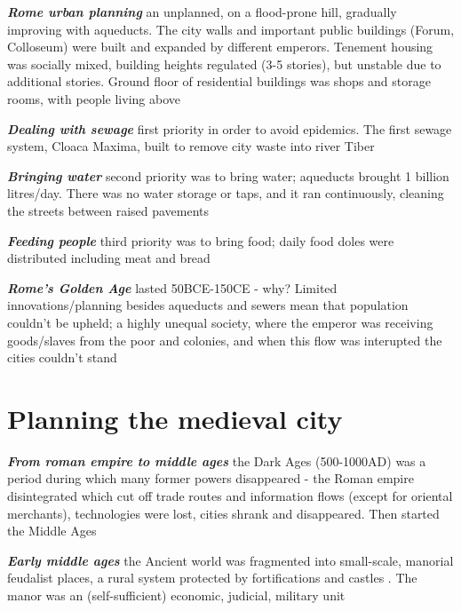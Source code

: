 \documentclass{article}
\newcommand{\bisection}[1]{\textbf{\textit{#1}}}
\newcommand{\alignedmarginpar}[1]{%
        \marginpar{\raggedright\small #1}
    }
\begin{document}
\bisection{Rome urban planning} an unplanned, on a flood-prone hill, gradually improving with aqueducts. The city walls and important public buildings (Forum, Colloseum) were built and expanded by different emperors. Tenement housing was socially mixed, building heights regulated (3-5 stories), but unstable due to additional stories. Ground floor of residential buildings was shops and storage rooms, with people living above

\bisection{Dealing with sewage} first priority in order to avoid epidemics. The first sewage system, Cloaca Maxima, built to remove city waste into river Tiber

\bisection{Bringing water} second priority was to bring water; aqueducts brought 1 billion litres/day. There was no water storage or taps, and it ran continuously, cleaning the streets between raised pavements

\bisection{Feeding people} third priority was to bring food; daily food doles were distributed including meat and bread

\bisection{Rome's Golden Age} lasted 50BCE-150CE - why? Limited innovations/planning besides aqueducts and sewers mean that population couldn't be upheld; a highly unequal society, where the emperor was receiving goods/slaves from the poor and colonies, and when this flow was interupted the cities couldn't stand


\pagebreak
\section{Planning the medieval city}

\bisection{From roman empire to middle ages} the Dark Ages (500-1000AD) was a period during which many former powers disappeared - the Roman empire disintegrated which cut off trade routes and information flows (except for oriental merchants), technologies were lost, cities shrank and disappeared. Then started the Middle Ages

\bisection{Early middle ages} the Ancient world was fragmented into small-scale, manorial feudalist places, a rural system protected by fortifications and castles\alignedmarginpar{Tower of London, Ljubljana castle}. The manor was an (self-sufficient) economic, judicial, military unit
\end{document}
